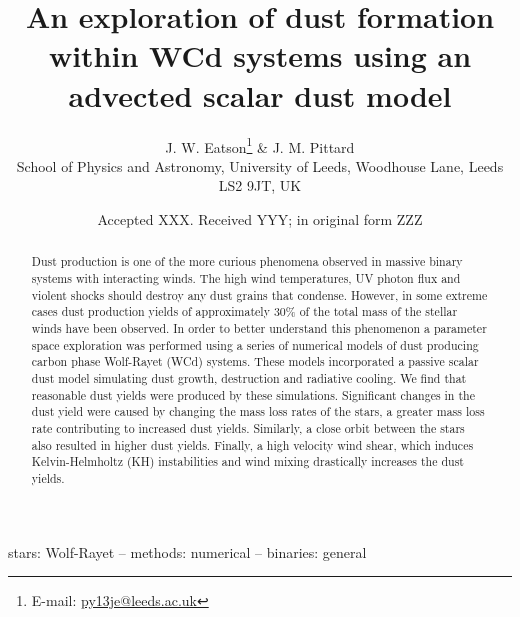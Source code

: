 \documentclass[fleqn,usenatbib]{mnras}
\title[Dust formation simulations in WCd systems]{An exploration of dust formation within WCd systems using an advected scalar dust model}
\author[J. W. Eatson et al.]{
J. W. Eatson\thanks{E-mail: \href{mailto:py13je@leeds.ac.uk}{py13je@leeds.ac.uk}} \&
J. M. Pittard
\\
School of Physics and Astronomy, University of
       Leeds, Woodhouse Lane, Leeds LS2 9JT, UK\\  
}
\date{Accepted XXX. Received YYY; in original form ZZZ}
\begin{document}
\label{firstpage}
\pagerange{\pageref{firstpage}--\pageref{lastpage}}
\maketitle

\begin{abstract}
\noindent
Dust production is one of the more curious phenomena observed in massive binary systems with interacting winds.
The high wind temperatures, UV photon flux and violent shocks should destroy any dust grains that condense.
However, in some extreme cases dust production yields of approximately 30\% of the total mass of the stellar winds have been observed.
In order to better understand this phenomenon a parameter space exploration was performed using a series of numerical models of dust producing carbon phase Wolf-Rayet (WCd) systems.
These models incorporated a passive scalar dust model simulating dust growth, destruction and radiative cooling.
We find that reasonable dust yields were produced by these simulations.
Significant changes in the dust yield were caused by changing the mass loss rates of the stars, a greater mass loss rate contributing to increased dust yields.
Similarly, a close orbit between the stars also resulted in higher dust yields.
Finally, a high velocity wind shear, which induces Kelvin-Helmholtz (KH) instabilities and wind mixing drastically increases the dust yields.

\end{abstract}

\begin{keywords}
stars: Wolf-Rayet -- methods: numerical -- binaries: general
\end{keywords}

\end{document}
